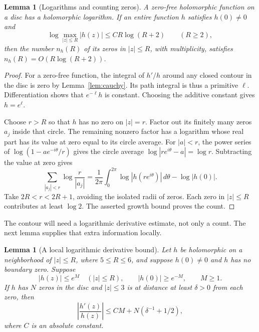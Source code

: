 \documentclass[11pt]{article}
\newtheorem{lemma}[theorem]{Lemma}
\theoremstyle{definition}
\theoremstyle{remark}
\numberwithin{equation}{section}
\begin{document}
\begin{lemma}[Logarithms and counting zeros]
\label{lem:jensen}
A zero-free holomorphic function on a disc has a holomorphic logarithm.
If an entire function $h$ satisfies $h(0)\ne0$ and
\[
 \log\max_{|z|\leq R}|h(z)|\leq C R\log(R+2)\qquad(R\geq2),
\]
then the number $n_h(R)$ of its zeros in $|z|\leq R$, with multiplicity,
satisfies $n_h(R)=O(R\log(R+2))$.
\end{lemma}

\begin{proof}
For a zero-free function, the integral of $h'/h$ around any closed contour
in the disc is zero by Lemma~\ref{lem:cauchy}.  Its path integral is thus a
primitive $\ell$.  Differentiation shows that $e^{-\ell}h$ is constant.
Choosing the additive constant gives $h=e^\ell$.

Choose $r>R$ so that $h$ has no zero on $|z|=r$.
Factor out its finitely many zeros $a_j$ inside that circle.
The remaining nonzero factor has a logarithm whose real part has its value
at zero equal to its circle average.
For $|a|<r$, the power series of $\log(1-ae^{-i\theta}/r)$ gives
the circle average $\log|re^{i\theta}-a|=\log r$.
Subtracting the value at zero gives
\[
 \sum_{|a_j|<r}\log\frac r{|a_j|}
 =\frac1{2\pi}\int_0^{2\pi}\log|h(re^{i\theta})|\,d\theta
       -\log|h(0)|.
\]
Take $2R<r<2R+1$, avoiding the isolated radii of zeros.
Each zero in $|z|\leq R$ contributes at least $\log2$.
The asserted growth bound proves the count.
\end{proof}

The contour will need a logarithmic derivative estimate, not only a count.
The next lemma supplies that extra information locally.

\begin{lemma}[A local logarithmic derivative bound]
\label{lem:local-log}
Let $h$ be holomorphic on a neighborhood of $|z|\leq R$, where
$5\leq R\leq6$, and suppose $h(0)\ne0$ and $h$ has no boundary zero.
Suppose
\[
 |h(z)|\leq e^M\quad(|z|\leq R),\qquad |h(0)|\geq e^{-M},\qquad M\geq1.
\]
If $h$ has $N$ zeros in the disc and $|z|\leq3$ is at distance at least
$\delta>0$ from each zero, then
\[
 \left|\frac{h'(z)}{h(z)}\right|
 \leq C M+N(\delta^{-1}+1/2),
\]
where $C$ is an absolute constant.
\end{lemma}
\end{document}
